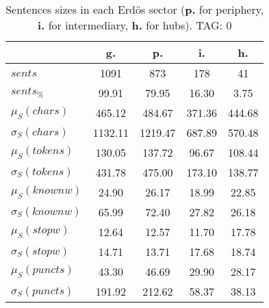 \begin{table}[h!]
\begin{center}
\begin{tabular}{| l || c | c | c | c |}\hline
 & {\bf g.} & {\bf p.} & {\bf i.} & {\bf h.} \\\hline\hline
$sents$ & 1091  & 873  & 178  & 41 \\
$sents_{\%}$ & 99.91  & 79.95  & 16.30  & 3.75 \\\hline
$\mu_S(chars)$ & 465.12  & 484.67  & 371.36  & 444.68 \\
$\sigma_S(chars)$ & 1132.11  & 1219.47  & 687.89  & 570.48 \\\hline
$\mu_S(tokens)$ & 130.05  & 137.72  & 96.67  & 108.44 \\
$\sigma_S(tokens)$ & 431.78  & 475.00  & 173.10  & 138.77 \\\hline
$\mu_S(knownw)$ & 24.90  & 26.17  & 18.99  & 22.85 \\
$\sigma_S(knownw)$ & 65.99  & 72.40  & 27.82  & 26.18 \\\hline
$\mu_S(stopw)$ & 12.64  & 12.57  & 11.70  & 17.78 \\
$\sigma_S(stopw)$ & 14.71  & 13.71  & 17.68  & 18.74 \\\hline
$\mu_S(puncts)$ & 43.30  & 46.69  & 29.90  & 28.17 \\
$\sigma_S(puncts)$ & 191.92  & 212.62  & 58.37  & 38.13 \\\hline
\end{tabular}
\caption{Sentences sizes in each Erd\"os sector ({{\bf p.}} for periphery, {{\bf i.}} for intermediary, {{\bf h.}} for hubs). TAG: 0}
\end{center}
\end{table}